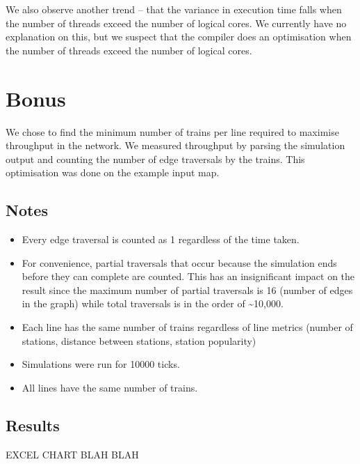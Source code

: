 \documentclass[a4paper,12pt]{article}
\begin{document}
We also observe another trend -- that the variance in execution time falls when the number of threads exceed the number of logical cores. We currently have no explanation on this, but we suspect that the compiler does an optimisation when the number of threads exceed the number of logical cores.


\section{Bonus}

We chose to find the minimum number of trains per line required to maximise throughput in the network. We measured throughput by parsing the simulation output and counting the number of edge traversals by the trains. This optimisation was done on the example input map.

\subsection{Notes}
\begin{itemize}
	\item Every edge traversal is counted as 1 regardless of the time taken.
	\item For convenience, partial traversals that occur because the simulation ends before they can complete are counted. This has an insignificant impact on the result since the maximum number of partial traversals is 16 (number of edges in the graph) while total traversals is in the order of \textasciitilde10,000.
	\item Each line has the same number of trains regardless of line metrics (number of stations, distance between stations, station popularity)
	\item Simulations were run for 10000 ticks.
	\item All lines have the same number of trains.
\end{itemize}

\subsection{Results}
EXCEL CHART BLAH BLAH
\end{document}
